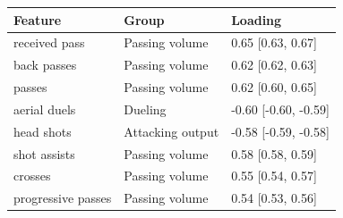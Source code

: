 
\begin{tabular}{lll}
\toprule
Feature & Group & Loading\\
\midrule
received pass & Passing volume & 0.65 [0.63, 0.67]\\
back passes & Passing volume & 0.62 [0.62, 0.63]\\
passes & Passing volume & 0.62 [0.60, 0.65]\\
aerial duels & Dueling & -0.60 [-0.60, -0.59]\\
head shots & Attacking output & -0.58 [-0.59, -0.58]\\
shot assists & Passing volume & 0.58 [0.58, 0.59]\\
crosses & Passing volume & 0.55 [0.54, 0.57]\\
progressive passes & Passing volume & 0.54 [0.53, 0.56]\\
\bottomrule
\end{tabular}
